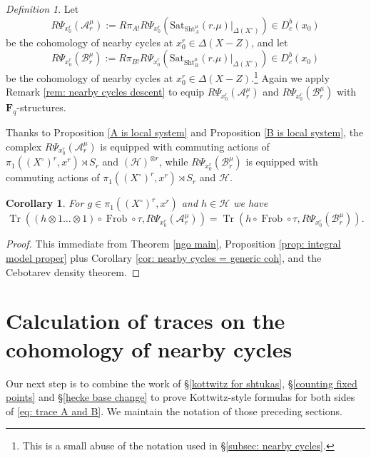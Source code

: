 \documentclass[reqno]{amsart}
\numberwithin{equation}{section}
\newcommand{\F}{\mathbf{F}}
\newcommand{\Cal}[1]{\mathcal{#1}}
\newcommand{\mrm}[1]{\mathrm{#1}}
\newcommand{\cX}{X^{\circ}}
\DeclareMathOperator{\Frob}{Frob}
\DeclareMathOperator{\Tr}{Tr}
\DeclareMathOperator{\Sht}{Sht}
\newtheorem{cor}[thm]{Corollary}
\theoremstyle{remark}
\newtheorem{defn}[thm]{Definition}
\numberwithin{equation}{section}
\begin{document}
\begin{defn}\label{def: A and B sheavs}
Let 
\[
R\Psi_{x_0^r}(\Cal{A}_r^{\mu}) := R\pi_{A!} R\Psi_{x_0^r}( \mrm{Sat}_{\Sht_A^{\mu} }(r.\mu)|_{\Delta(\cX)})  \in D_c^b(x_0)
\]
be the cohomology of nearby cycles at $x_0^r \in \Delta(X-Z)$, and let 
\[
R\Psi_{x_0^r}(\Cal{B}_r^{\mu})  := R\pi_{B!} R\Psi_{x_0^r}(\mrm{Sat}_{\Sht_B^{\mu} }(r.\mu)|_{\Delta(\cX)})  \in D_c^b(x_0)
\]
be the cohomology of nearby cycles at $x_0^r \in \Delta(X-Z)$.\footnote{This is a small abuse of the notation used in \S \ref{subsec: nearby cycles}.} Again we apply Remark \ref{rem: nearby cycles descent} to equip $R\Psi_{x_0^r}(\Cal{A}_r^{\mu})$ and $R\Psi_{x_0^r}(\Cal{B}_r^{\mu})$ with $\F_q$-structures.

Thanks to Proposition \ref{A is local system} and Proposition \ref{B is local system}, the complex $R\Psi_{x_0^r}(\Cal{A}_r^{\mu})$ is equipped with commuting actions of $\pi_1((\cX)^r, x^r) \rtimes S_r$ and $(\Cal{H})^{\otimes r}$, while $R\Psi_{x_0^r}(\Cal{B}_r^{\mu})$ is equipped with commuting actions of $\pi_1((\cX)^r, x^r) \rtimes S_r$ and $\Cal{H}$. 

\end{defn}



\begin{cor}\label{equality traces}
For $g \in \pi_1((\cX)^r, x^r)$ and $h \in \Cal{H}$ we have 
\begin{equation}\label{eq: trace A and B}
\Tr(( h\otimes 1 \ldots \otimes 1 ) \circ \Frob \circ \tau , R\Psi_{x_0^r}(\Cal{A}_r^{\mu})) = \Tr(h \circ \Frob  \circ \tau, R\Psi_{x_0^r}(\Cal{B}_r^{\mu})).
\end{equation}
\end{cor} 

\begin{proof}
This immediate from Theorem \ref{ngo main}, Proposition \ref{prop: integral model proper} plus Corollary \ref{cor: nearby cycles = generic coh}, and the Cebotarev density theorem. 
\end{proof}





\section{Calculation of traces on the cohomology of nearby cycles	}\label{computation of trace}


Our next step is to combine the work of \S \ref{kottwitz for shtukas}, \S \ref{counting fixed points} and \S \ref{hecke base change} to prove Kottwitz-style formulas for both sides of \eqref{eq: trace A and B}. We maintain the notation of those preceding sections. 
\end{document}
